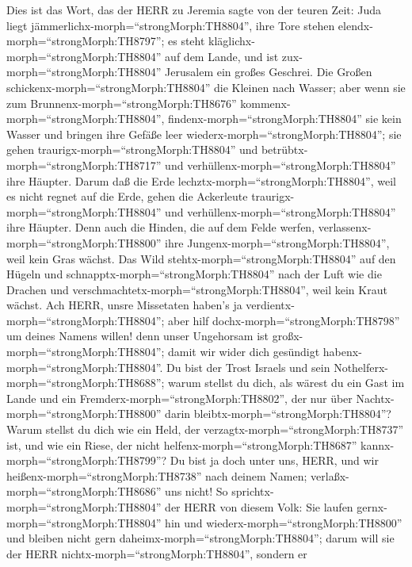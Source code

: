  Dies ist das Wort, das der HERR zu Jeremia sagte von der
teuren Zeit:  Juda liegt
jämmerlichx-morph=``strongMorph:TH8804'', ihre Tore stehen
elendx-morph=``strongMorph:TH8797''; es steht
kläglichx-morph=``strongMorph:TH8804'' auf dem Lande, und ist
zux-morph=``strongMorph:TH8804'' Jerusalem ein großes Geschrei.
 Die Großen schickenx-morph=``strongMorph:TH8804'' die
Kleinen nach Wasser; aber wenn sie zum
Brunnenx-morph=``strongMorph:TH8676''
kommenx-morph=``strongMorph:TH8804'',
findenx-morph=``strongMorph:TH8804'' sie kein Wasser und bringen ihre
Gefäße leer wiederx-morph=``strongMorph:TH8804''; sie gehen
traurigx-morph=``strongMorph:TH8804'' und
betrübtx-morph=``strongMorph:TH8717'' und
verhüllenx-morph=``strongMorph:TH8804'' ihre Häupter.  Darum
daß die Erde lechztx-morph=``strongMorph:TH8804'', weil es nicht regnet
auf die Erde, gehen die Ackerleute traurigx-morph=``strongMorph:TH8804''
und verhüllenx-morph=``strongMorph:TH8804'' ihre Häupter. 
Denn auch die Hinden, die auf dem Felde werfen,
verlassenx-morph=``strongMorph:TH8800'' ihre
Jungenx-morph=``strongMorph:TH8804'', weil kein Gras wächst.
 Das Wild stehtx-morph=``strongMorph:TH8804'' auf den Hügeln
und schnapptx-morph=``strongMorph:TH8804'' nach der Luft wie die Drachen
und verschmachtetx-morph=``strongMorph:TH8804'', weil kein Kraut wächst.
 Ach HERR, unsre Missetaten haben's ja
verdientx-morph=``strongMorph:TH8804''; aber hilf
dochx-morph=``strongMorph:TH8798'' um deines Namens willen! denn unser
Ungehorsam ist großx-morph=``strongMorph:TH8804''; damit wir wider dich
gesündigt habenx-morph=``strongMorph:TH8804''.  Du bist der
Trost Israels und sein Nothelferx-morph=``strongMorph:TH8688''; warum
stellst du dich, als wärest du ein Gast im Lande und ein
Fremderx-morph=``strongMorph:TH8802'', der nur über
Nachtx-morph=``strongMorph:TH8800'' darin
bleibtx-morph=``strongMorph:TH8804''?  Warum stellst du dich
wie ein Held, der verzagtx-morph=``strongMorph:TH8737'' ist, und wie ein
Riese, der nicht helfenx-morph=``strongMorph:TH8687''
kannx-morph=``strongMorph:TH8799''? Du bist ja doch unter uns, HERR, und
wir heißenx-morph=``strongMorph:TH8738'' nach deinem Namen;
verlaßx-morph=``strongMorph:TH8686'' uns nicht!  So
sprichtx-morph=``strongMorph:TH8804'' der HERR von diesem Volk: Sie
laufen gernx-morph=``strongMorph:TH8804'' hin und
wiederx-morph=``strongMorph:TH8800'' und bleiben nicht gern
daheimx-morph=``strongMorph:TH8804''; darum will sie der HERR
nichtx-morph=``strongMorph:TH8804'', sondern er
